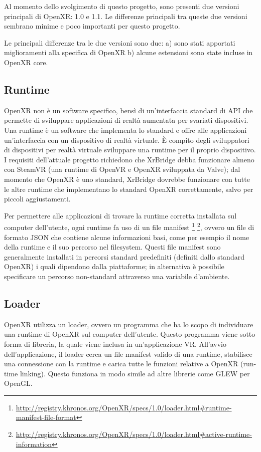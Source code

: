 \documentclass[twoside]{supsistudent}
\begin{document}
Al momento dello svolgimento di questo progetto, sono presenti due versioni principali di OpenXR: 1.0 e 1.1. Le differenze principali tra queste due versioni sembrano minime e poco importanti per questo progetto.

Le principali differenze tra le due versioni sono due: a) sono stati apportati miglioramenti alla specifica di OpenXR b) alcune estensioni sono state incluse in OpenXR core.

\subsection{Runtime}

OpenXR non è un software specifico, bensì di un'interfaccia standard di API che permette di sviluppare applicazioni di realtà aumentata per svariati dispositivi. Una runtime è un software che implementa lo standard e offre alle applicazioni un'interfaccia con un dispositivo di realtà virtuale. È compito degli sviluppatori di dispositivi per realtà virtuale sviluppare una runtime per il proprio dispositivo. I requisiti dell'attuale progetto richiedono che XrBridge debba funzionare almeno con SteamVR (una runtime di OpenVR e OpenXR sviluppata da Valve); dal momento che OpenXR è uno standard, XrBridge dovrebbe funzionare con tutte le altre runtime che implementano lo standard OpenXR correttamente, salvo per piccoli aggiustamenti.

Per permettere alle applicazioni di trovare la runtime corretta installata sul computer dell'utente, ogni runtime fa uso di un file manifest \footnote{\url{http://registry.khronos.org/OpenXR/specs/1.0/loader.html\#runtime-manifest-file-format}} \footnote{\url{http://registry.khronos.org/OpenXR/specs/1.0/loader.html\#active-runtime-information}}, ovvero un file di formato JSON che contiene alcune informazioni basi, come per esempio il nome della runtime e il suo percorso nel filesystem. Questi file manifest sono generalmente installati in percorsi standard predefiniti (definiti dallo standard OpenXR) i quali dipendono dalla piattaforme; in alternativa è possibile specificare un percorso non-standard attraverso una variabile d'ambiente.

\subsection{Loader}

OpenXR utilizza un loader, ovvero un programma che ha lo scopo di individuare una runtime di OpenXR sul computer dell'utente. Questo programma viene sotto forma di libreria, la quale viene inclusa in un'applicazione VR. All'avvio dell'applicazione, il loader cerca un file manifest valido di una runtime, stabilisce una connessione con la runtime e carica tutte le funzioni relative a OpenXR (run-time linking). Questo funziona in modo simile ad altre librerie come GLEW per OpenGL.
\end{document}
